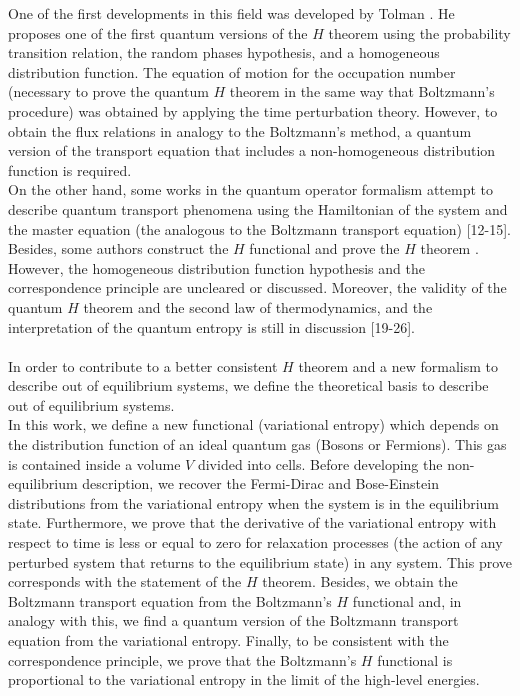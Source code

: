 \documentclass{article}
\begin{document}
{One of the first developments in this field was developed by Tolman \cite{tolman}. He proposes one of the first quantum versions of the $H$ theorem using the probability transition relation, the random phases hypothesis, and a homogeneous distribution function. The equation of motion for the occupation number (necessary to prove the quantum $H$ theorem in the same way that Boltzmann's procedure) was obtained by applying the time perturbation theory. However, to obtain the flux relations in analogy to the Boltzmann's method, a quantum version of the transport equation that includes a non-homogeneous distribution function is required.\\
On the other hand, some works in the quantum operator formalism attempt to describe quantum transport phenomena using the Hamiltonian of the system and the master equation (the analogous to the Boltzmann transport equation) [12-15]. %
Besides, some authors construct the $H$ functional and prove the $H$ theorem \cite{htheorem2, quantum1, quantum2}. However, the homogeneous distribution function hypothesis and the correspondence principle are uncleared or discussed. Moreover, the validity of the quantum $H$ theorem and the second law of thermodynamics, and the interpretation of the quantum entropy is still in discussion [19-26].\\ %
\\
In order to contribute to a better consistent $H$ theorem and a new formalism to describe out of equilibrium systems, we define the theoretical basis to describe out of equilibrium systems.\\
In this work, we define a new functional (variational entropy) which depends on the distribution function of an ideal quantum gas (Bosons or Fermions). This gas is contained inside a volume $V$ divided into cells. Before developing the non-equilibrium description, we recover the Fermi-Dirac and Bose-Einstein distributions from the variational entropy when the system is in the equilibrium state. Furthermore, we prove that the derivative of the variational entropy with respect to time is less or equal to zero for relaxation processes (the action of any perturbed system that returns to the equilibrium state) in any system. This prove corresponds with the statement of the $H$ theorem. Besides, we obtain the Boltzmann transport equation from the Boltzmann's $H$ functional and, in analogy with this, we find a quantum version of the Boltzmann transport equation from the variational entropy. Finally, to be consistent with the correspondence principle, we prove that the Boltzmann's $H$ functional is proportional to the variational entropy in the limit of the high-level energies.}
\end{document}
